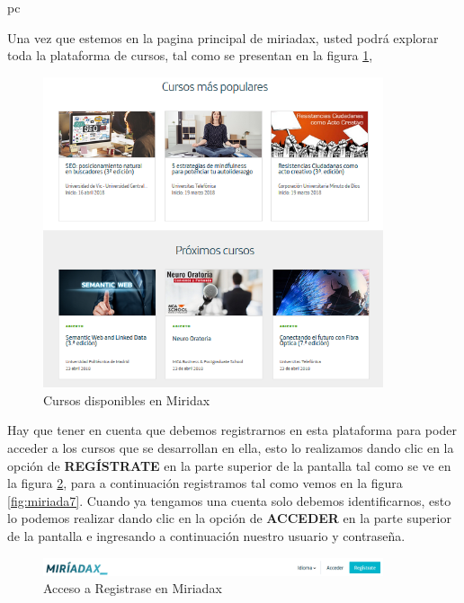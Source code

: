 pc\documentclass[a4paper,12pt,openany]{book}
\begin{document}
Una vez que estemos en la pagina principal de miriadax, usted podrá explorar toda la plataforma de cursos, tal como se presentan en la figura \ref{fig:miriada2}, 

\begin{figure}[ht]
  \centering
	\includegraphics[width=10cm]{miriada2.png}
\caption{Cursos disponibles en Miridax}
  \label{fig:miriada2}
\end{figure}

Hay que tener en cuenta que debemos registrarnos en esta plataforma para poder acceder a los cursos que se desarrollan en ella, esto lo realizamos dando clic en la opción de \textbf{REGÍSTRATE} en la parte superior de la pantalla tal como se ve en la figura \ref{fig:miriada3}, para a continuación registramos tal como vemos en la figura \ref{fig:miriada7}. Cuando ya tengamos una cuenta solo debemos identificarnos, esto lo podemos realizar dando  clic en la opción de \textbf{ACCEDER} en la parte superior de la pantalla e ingresando a continuación nuestro usuario y contraseña. 

\begin{figure}[ht]
  \centering
	\includegraphics[width=10cm]{miriada3.png}
\caption{Acceso a Registrase en Miriadax}
  \label{fig:miriada3}
\end{figure}
\end{document}
